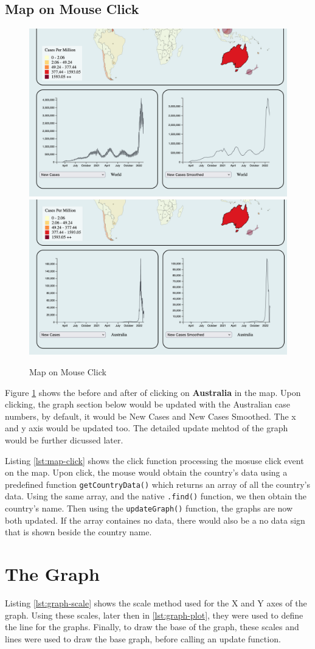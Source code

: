 \documentclass{scrreprt}
\begin{document}
\subsection{Map on Mouse Click}
\begin{figure}[H]
    \centering
    \includegraphics[height=0.3\textwidth]{images/click_1.png}
    \includegraphics[height=0.3\textwidth]{images/click_2.png}
    \caption{Map on Mouse Click}
    \label{fig:map-click}
\end{figure}
Figure \ref{fig:map-click} shows the before and after of clicking on \textbf{Australia} in the map. Upon clicking, the graph section below would be updated with the Australian case numbers, by default, it would be New Cases and New Cases Smoothed. The x and y axis would be updated too. The detailed update mehtod of the graph would be further dicussed later.
\vspace{8pt}

Listing \ref{lst:map-click} shows the click function processing the mosuse click event on the map. Upon click, the mouse would obtain the country's data using a predefined function \verb|getCountryData()| which returns an array of all the country's data. Using the same array, and the native \verb|.find()| function, we then obtain the country's name. Then using the \verb|updateGraph()| function, the graphs are now both updated. If the array containes no data, there would also be a no data sign that is shown beside the country name. 

\section{The Graph}


Listing \ref{lst:graph-scale} shows the scale method used for the X and Y axes of the graph. Using these scales, later then in \ref{lst:graph-plot}, they were used to define the line for the graphs. Finally, to draw the base of the graph, these scales and lines were used to draw the base graph, before calling an update function. 
\end{document}

